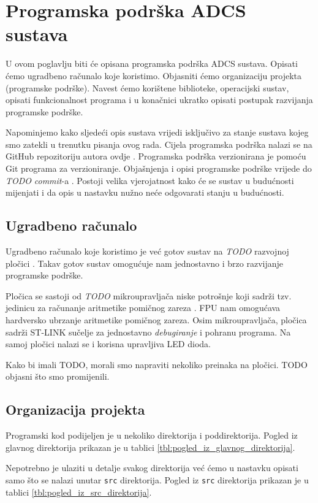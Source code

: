\documentclass[times, utf8, diplomski, numeric]{templates/template}
\begin{document}
\chapter{Programska podrška ADCS sustava}{
    U ovom poglavlju biti će opisana programska podrška ADCS sustava. Opisati ćemo ugradbeno računalo koje koristimo. Objasniti ćemo organizaciju projekta (programske podrške). Navest ćemo korištene biblioteke, operacijski sustav, opisati funkcionalnost programa i u konačnici ukratko opisati postupak razvijanja programske podrške.

    Napominjemo kako sljedeći opis sustava vrijedi isključivo za stanje sustava kojeg smo zatekli u trenutku pisanja ovog rada. Cijela programska podrška nalazi se na GitHub repozitoriju autora ovdje \cite{github_repo}. Programska podrška verzionirana je pomoću Git \cite{git} programa za verzioniranje. Objašnjenja i opisi programske podrške vrijede do \emph{TODO} \emph{commit}-a \cite{git_commit}. Postoji velika vjerojatnost kako će se sustav u budućnosti mijenjati i da opis u nastavku nužno neće odgovarati stanju u budućnosti. 

    \section{Ugradbeno računalo}{
        Ugradbeno računalo koje koristimo je već gotov sustav na \emph{TODO} razvojnoj pločici \cite{}. Takav gotov sustav omogućuje nam jednostavno i brzo razvijanje programske podrške. 

        Pločica se sastoji od \emph{TODO} mikroupravljača niske potrošnje koji sadrži tzv. jedinicu za računanje aritmetike pomičnog zareza . FPU nam omogućava hardversko ubrzanje aritmetike pomičnog zareza. Osim mikroupravljača, pločica sadrži ST-LINK sučelje za jednostavno \emph{debugiranje} i pohranu programa. Na samoj pločici nalazi se i korisna upravljiva LED dioda.

        Kako bi imali TODO, morali smo napraviti nekoliko preinaka na pločici. TODO objasni što smo promijenili. 
    }

    \section{Organizacija projekta}{
        Programski kod podijeljen je u nekoliko direktorija i poddirektorija. Pogled iz glavnog direktorija prikazan je u tablici \ref{tbl:pogled_iz_glavnog_direktorija}.

        Nepotrebno je ulaziti u detalje svakog direktorija već ćemo u nastavku opisati samo što se nalazi unutar \texttt{src} direktorija. Pogled iz \texttt{src} direktorija prikazan je u tablici \ref{tbl:pogled_iz_src_direktorija}.

}}
\end{document}
